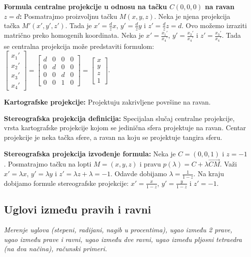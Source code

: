 \documentclass[12pt]{article}
\newcommand{\vek}[1]{\overrightarrow{#1}}
\begin{document}
\textbf{Formula centralne projekcije u odnosu na tačku $C(0,0,0)$ na ravan
    $z=d$:} Posmatrajmo proizvoljnu tačku $M(x,y,z)$. Neka je njena projekcija
tačka $M'(x',y',z')$. Tada je $x'=\frac{d}{z}x$, $y'=\frac{d}{z}y$
i $z'=\frac{d}{z}z=d$. Ovo možemo izraziti matrično preko homogenih
koordinata. Neka je $x'=\frac{x_1'}{x_4'}$, $y'=\frac{x_2'}{x_4'}$ i
$z'=\frac{x_3'}{x_4'}$. Tada se centralna projekcija može predstaviti formulom:
$\begin{bmatrix}
        x_1' \\
        x_2' \\
        x_3' \\
        x_4'
    \end{bmatrix}=\begin{bmatrix}
        d & 0 & 0 & 0 \\
        0 & d & 0 & 0 \\
        0 & 0 & d & 0 \\
        0 & 0 & 1 & 0
    \end{bmatrix}=\begin{bmatrix}
        x \\
        y \\
        z \\
        1
    \end{bmatrix}$.
\par

\textbf{Kartografske projekcije:} Projektuju zakrivljene površine na ravan.
\par

\textbf{Stereografska projekcija definicija:} Specijalan slučaj centralne projekcije,
vrsta kartografske projekcije kojom se jedinična sfera projektuje na ravan.
Centar projekcije je neka tačka sfere, a ravan na koju se projektuje tangira
sferu.
\par

\textbf{Stereografska projekcija izvođenje formula:} Neka je $C=(0,0,1)$ i
$z=-1$. Posmatrajmo tačku na lopti $M=(x,y,z)$ i pravu
$p(\lambda)=C+\lambda\vek{CM}$. Važi $x'=\lambda x$, $y'=\lambda y$ i
$z'=\lambda z+\lambda=-1$. Odavde dobijamo $\lambda=\frac{1}{1-z}$. Na kraju
dobijamo formule stereografske projekcije: $x'=\frac{x}{1-z}$,
$y'=\frac{y}{1-z}$ i $z'=-1$.


\subsection{Uglovi između pravih i ravni}
\textit{Merenje uglova (stepeni, radijani, nagib u procentima), ugao između 2
    prave, ugao između prave i ravni, ugao između dve ravni, ugao između
    pljosni tetraedra (na dva načina), računski primeri.}
\par
\vspace*{1cm}
\end{document}
